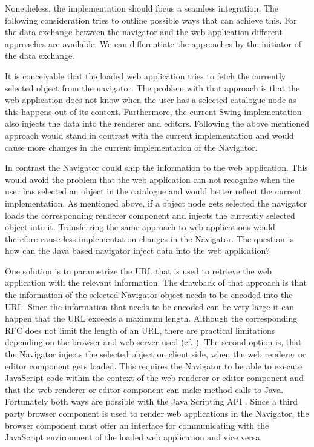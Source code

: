 Nonetheless, the implementation should focus a seamless integration.
The following consideration tries to outline possible ways that can achieve this.
For the data exchange between the navigator and the web application different approaches are available.
We can differentiate the approaches by the initiator of the data exchange.

It is conceivable that the loaded web application tries to fetch the currently selected object from the navigator.
The problem with that approach is that the web application does not know when the user has a selected catalogue node as this happens out of its context. 
Furthermore, the current Swing implementation also injects the data into the renderer and editors. 
Following the above mentioned approach would stand in contrast with the current implementation and would cause more changes in the current implementation of the Navigator.

In contrast the Navigator could ship the information to the web application.
This would avoid the problem that the web application can not recognize when the user has selected an object in the catalogue and would better reflect the current implementation.
As mentioned above, if a object node gets selected the navigator loads the corresponding renderer component and injects the currently selected object into it.
Transferring the same approach to web applications would therefore cause less implementation changes in the Navigator.
The question is how can the Java based navigator inject data into the web application? 

One solution is to parametrize the URL that is used to retrieve the web application with the relevant information.
The drawback of that approach is that the information of the selected Navigator object needs to be encoded into the URL.
Since the information that needs to be encoded can be very large it can happen that the URL exceeds a maximum length.
Although the corresponding RFC \autocite{conception:rfc-uri}  does not limit the length of an URL, there are practical limitations depending on the browser and web server used (cf. \autocite{conception:uri-length}).
The second option is, that the Navigator injects the selected object on client side, when the web renderer or editor component gets loaded.
This requires the Navigator to be able to execute JavaScript code within the context of the web renderer or editor component and that the web renderer or editor component can make method calls to Java.
Fortunately both ways are possible with the Java Scripting API \autocite{conception:rhino}.
Since a third party browser component is used to render web applications in the Navigator, the browser component must offer an interface for communicating with the JavaScript environment of the loaded web application and vice versa.

